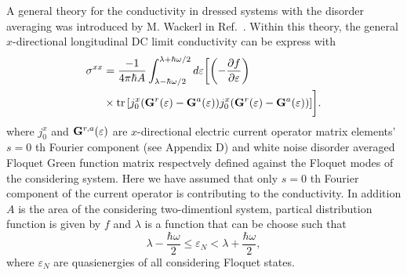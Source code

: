 
A general theory for the conductivity in dressed systems with the disorder averaging was introduced by M. Wackerl in Ref.~\cite{wackerl20,wackerlthesis20}. Within this theory, the general $x$-directional longitudinal DC limit conductivity can be express with
\begin{equation} \label{eq_20}
  \begin{aligned}
    {\sigma}^{xx} &=
    \frac{-1}{4\pi\hbar A}
    \int_{\lambda-\hbar\omega/2}^{\lambda+ \hbar\omega/2} d\varepsilon \bigg[
    \qty(
    -\frac{\partial f}{\partial \varepsilon})
    \\
    & \times
    \tr
    \qty[
    {j}^x_0
    \qty(
    \vb{G}^{r} (\varepsilon) - \vb{G}^{a} (\varepsilon)
    )
    {j}^x_0
    \qty(
    \vb{G}^{r} (\varepsilon) - \vb{G}^{a} (\varepsilon)
    )
    ]\bigg].
  \end{aligned}
\end{equation}
where ${j}^x_0$ and $\vb{G}^{r,a} (\varepsilon)$ are $x$-directional electric current operator matrix elements' $s=0$ th Fourier component (see Appendix D) and white noise disorder averaged Floquet Green function matrix \cite{wackerl20,wackerlthesis20} respectvely defined against the Floquet modes of the considering system. Here we have assumed that only $s=0$ th Fourier component of the current operator is contributing to the conductivity. In addition $A$ is the area of the considering two-dimentionl system, partical distribution function is given by $f$ and $\lambda$ is a function that can be choose such that
\begin{equation} \label{eq_21}
    \lambda - \frac{\hbar \omega}{2}
    \leq \varepsilon_N
    <
    \lambda + \frac{\hbar \omega}{2},
\end{equation}
where $ \varepsilon_N$ are quasienergies of all considering Floquet states.

